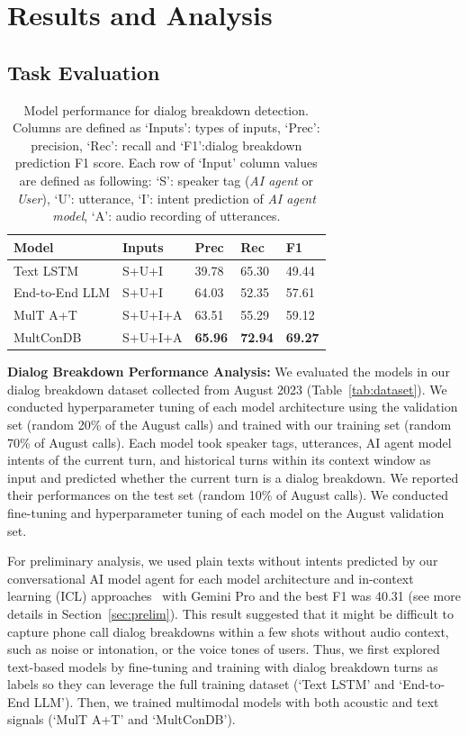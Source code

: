 \section{Results and Analysis}

\subsection{Task Evaluation \label{sec:task_eval}}
\begin{table}
\small
\centering
\begin{tabular}{l|l|lll}
\hline
\textbf{Model} & \textbf{Inputs} & \textbf{Prec} & \textbf{Rec} & \textbf{F1}\\
\hline
Text LSTM & S+U+I & 39.78 & 65.30 & 49.44 \\ 
End-to-End LLM & S+U+I & 64.03 & 52.35 & 57.61 \\ 
MulT A+T & S+U+I+A & 63.51 & 55.29 & 59.12 \\\hline
MultConDB & S+U+I+A  & \textbf{65.96} & \textbf{72.94} & \textbf{69.27} \\\hline
\end{tabular}
\caption{\label{tab:model_performance} Model performance for dialog breakdown detection. Columns are defined as `Inputs': types of inputs, `Prec': precision, `Rec': recall and `F1':dialog breakdown prediction F1 score. Each row of `Input' column values are defined as following: `S': speaker tag (\textit{AI agent} or \textit{User}), `U': utterance, `I': intent prediction of \textit{AI agent model}, `A': audio recording of utterances.}

\end{table}

\textbf{Dialog Breakdown Performance Analysis:} We evaluated the models in our dialog breakdown dataset collected from August 2023 (Table~\ref{tab:dataset}). We conducted hyperparameter tuning of each model architecture using the validation set (random 20\% of the August calls) and trained with our training set (random 70\% of August calls). Each model took speaker tags, utterances, AI agent model intents of the current turn, and historical turns within its context window as input and predicted whether the current turn is a dialog breakdown. We reported their performances on the test set (random 10\% of August calls). We conducted fine-tuning and hyperparameter tuning of each model on the August validation set.

For preliminary analysis, we used plain texts without intents predicted by our conversational AI model agent for each model architecture and in-context learning (ICL) approaches~\cite{brown2020language} with Gemini Pro and the best F1 was 40.31 (see more details in Section~\ref{sec:prelim}). This result suggested that it might be difficult to capture phone call dialog breakdowns within a few shots without audio context, such as noise or intonation, or the voice tones of users. Thus, we first explored text-based models by fine-tuning and training with dialog breakdown turns as labels so they can leverage the full training dataset (`Text LSTM' and `End-to-End LLM'). Then, we trained multimodal models with both acoustic and text signals (`MulT A+T' and `MultConDB').

